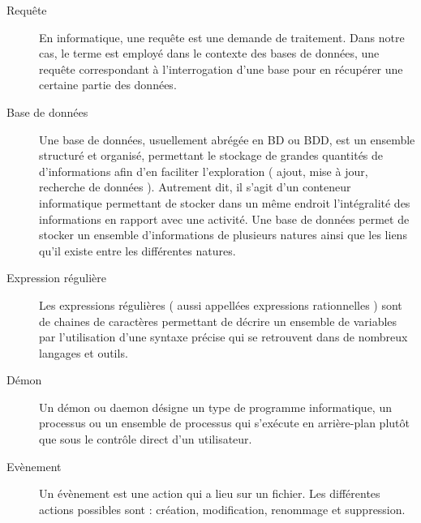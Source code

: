 \begin{description}
\item[Requête]
 En informatique, une requête est une demande de traitement. Dans notre cas, le
terme est employé dans le contexte des bases de données, une requête
correspondant à l'interrogation d'une base pour en récupérer une certaine partie
des données.
 
\item[Base de données]
 Une base de données, usuellement abrégée en BD ou BDD, est un ensemble
structuré et organisé, permettant le stockage de grandes quantités de
d'informations afin d'en faciliter l'exploration ( ajout, mise à jour, recherche
de données ). Autrement dit, il s’agit d’un conteneur informatique permettant de
stocker dans un même endroit l'intégralité des informations en rapport avec une
activité. Une base de données permet de stocker un ensemble d'informations de
plusieurs natures ainsi que les liens qu'il existe entre les différentes
natures.

\item[Expression régulière]
 Les expressions régulières ( aussi appellées expressions rationnelles ) sont de
chaines de caractères permettant de décrire un ensemble de variables par
l'utilisation d'une syntaxe précise qui se retrouvent dans de nombreux langages
et outils.
 
\item[Démon]
 Un démon ou daemon désigne un type de programme informatique, un processus ou
un ensemble de processus qui s'exécute en arrière-plan plutôt que sous le
contrôle direct d'un utilisateur.

\item[Evènement]
 Un évènement est une action qui a lieu sur un fichier. Les différentes actions 
 possibles sont : création, modification, renommage et suppression.

\end{description}

